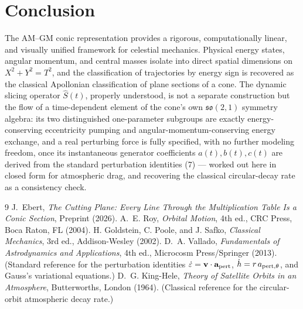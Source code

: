 \documentclass[11pt]{amsart}
\begin{document}
\section{Conclusion}

The AM--GM conic representation provides a rigorous, computationally linear, and visually unified framework for celestial mechanics. Physical energy states, angular momentum, and central masses isolate into direct spatial dimensions on $X^2+Y^2=T^2$, and the classification of trajectories by energy sign is recovered as the classical Apollonian classification of plane sections of a cone. The dynamic slicing operator $\hat S(t)$, properly understood, is not a separate construction but the flow of a time-dependent element of the cone's own $\mathfrak{so}(2,1)$ symmetry algebra: its two distinguished one-parameter subgroups are exactly energy-conserving eccentricity pumping and angular-momentum-conserving energy exchange, and a real perturbing force is fully specified, with no further modeling freedom, once its instantaneous generator coefficients $a(t),b(t),c(t)$ are derived from the standard perturbation identities (7) --- worked out here in closed form for atmospheric drag, and recovering the classical circular-decay rate as a consistency check.

\begin{thebibliography}{9}
 J.~Ebert, \emph{The Cutting Plane: Every Line Through the Multiplication Table Is a Conic Section}, Preprint (2026).
 A.~E. Roy, \emph{Orbital Motion}, 4th ed., CRC Press, Boca Raton, FL (2004).
 H. Goldstein, C. Poole, and J. Safko, \emph{Classical Mechanics}, 3rd ed., Addison-Wesley (2002).
 D.~A. Vallado, \emph{Fundamentals of Astrodynamics and Applications}, 4th ed., Microcosm Press/Springer (2013). (Standard reference for the perturbation identities $\dot\varepsilon=\mathbf v\cdot\mathbf a_{\rm pert}$, $\dot h=r\,a_{{\rm pert},\theta}$, and Gauss's variational equations.)
 D.~G. King-Hele, \emph{Theory of Satellite Orbits in an Atmosphere}, Butterworths, London (1964). (Classical reference for the circular-orbit atmospheric decay rate.)
\end{thebibliography}
\end{document}
